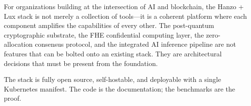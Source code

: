 \documentclass[11pt,twocolumn]{article}
\begin{document}
For organizations building at the intersection of AI and blockchain, the Hanzo + Lux stack is not merely a collection of tools---it is a coherent platform where each component amplifies the capabilities of every other. The post-quantum cryptographic substrate, the FHE confidential computing layer, the zero-allocation consensus protocol, and the integrated AI inference pipeline are not features that can be bolted onto an existing stack. They are architectural decisions that must be present from the foundation.

The stack is fully open source, self-hostable, and deployable with a single Kubernetes manifest. The code is the documentation; the benchmarks are the proof.

\end{document}
